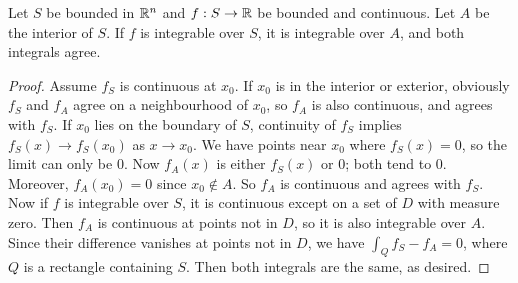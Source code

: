 \documentclass[12pt]{article}
\begin{document}
\begin{thm}
    Let $S$ be bounded in $\mathbb{R}^n$ and $f:S \rightarrow \mathbb{R}$ be bounded and continuous. Let $A$ be the interior of $S$. If $f$ is integrable over $S$, it is integrable over $A$, and both integrals agree.
\end{thm}

\begin{proof}
    Assume $f_S$ is continuous at $x_0$. If $x_0$ is in the interior or exterior, obviously $f_S$ and $f_A$ agree on a neighbourhood of $x_0$, so $f_A$ is also continuous, and agrees with $f_S$. If $x_0$ lies on the boundary of $S$, continuity of $f_S$ implies $f_S(x) \rightarrow f_S(x_0)$ as $x \rightarrow x_0$. We have points near $x_0$ where $f_S(x) = 0$, so the limit can only be 0. Now $f_A(x)$ is either $f_S(x)$ or 0; both tend to 0. Moreover, $f_A(x_0) = 0$ since $x_0 \notin A$. So $f_A$ is continuous and agrees with $f_S$. \\
    Now if $f$ is integrable over $S$, it is continuous except on a set of $D$ with measure zero. Then $f_A$ is continuous at points not in $D$, so it is also integrable over $A$. Since their difference vanishes at points not in $D$, we have $\int_Q f_S - f_A = 0$, where $Q$ is a rectangle containing $S$. Then both integrals are the same, as desired.
\end{proof}
\end{document}
